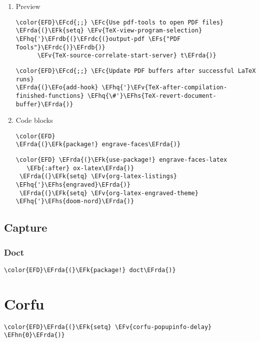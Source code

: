 \documentclass[12pt]{article}
\theoremstyle{plain}%
\theoremstyle{definition}
\theoremstyle{remark}
\newcommand{\EFc}[1]{\textcolor{EFc}{#1}} %
\newcommand{\EFcd}[1]{\textcolor{EFcd}{#1}} %
\newcommand{\EFs}[1]{\textcolor{EFs}{#1}} %
\newcommand{\EFk}[1]{\textcolor{EFk}{#1}} %
\newcommand{\EFb}[1]{\textcolor{EFb}{#1}} %
\newcommand{\EFv}[1]{\textcolor{EFv}{#1}} %
\newcommand{\EFo}[1]{\textcolor{EFo}{#1}} %
\newcommand{\EFhn}[1]{\textcolor{EFhn}{\textbf{#1}}} %
\newcommand{\EFhq}[1]{\textcolor{EFhq}{#1}} %
\newcommand{\EFhs}[1]{\textcolor{EFhs}{#1}} %
\newcommand{\EFrda}[1]{\textcolor{EFrda}{#1}} %
\newcommand{\EFrdb}[1]{\textcolor{EFrdb}{#1}} %
\newcommand{\EFrdc}[1]{\textcolor{EFrdc}{#1}} %
\begin{document}
\begin{enumerate}
\item Preview
\label{sec:orgb0fd629}
\begin{Code}
\begin{Verbatim}
\color{EFD}\EFcd{;;} \EFc{Use pdf-tools to open PDF files}
\EFrda{(}\EFk{setq} \EFv{TeX-view-program-selection} \EFhq{'}\EFrdb{(}\EFrdc{(}output-pdf \EFs{"PDF Tools"}\EFrdc{)}\EFrdb{)}
      \EFv{TeX-source-correlate-start-server} t\EFrda{)}
\end{Verbatim}
\end{Code}
\begin{Code}
\begin{Verbatim}
\color{EFD}\EFcd{;;} \EFc{Update PDF buffers after successful LaTeX runs}
\EFrda{(}\EFo{add-hook} \EFhq{'}\EFv{TeX-after-compilation-finished-functions} \EFhq{\#'}\EFhs{TeX-revert-document-buffer}\EFrda{)}
\end{Verbatim}
\end{Code}
\item Code blocks
\label{sec:org786ba05}
\begin{Code}
\begin{Verbatim}
\color{EFD}
\EFrda{(}\EFk{package!} engrave-faces\EFrda{)}
\end{Verbatim}
\end{Code}
\begin{Code}
\begin{Verbatim}
\color{EFD} \EFrda{(}\EFk{use-package!} engrave-faces-latex
   \EFb{:after} ox-latex\EFrda{)}
 \EFrda{(}\EFk{setq} \EFv{org-latex-listings} \EFhq{'}\EFhs{engraved}\EFrda{)}
 \EFrda{(}\EFk{setq} \EFv{org-latex-engraved-theme} \EFhq{'}\EFhs{doom-nord}\EFrda{)}
\end{Verbatim}
\end{Code}
\end{enumerate}
\subsection{Capture}
\label{sec:org5c9a076}
\subsubsection{Doct}
\label{sec:org2c1da48}
\begin{Code}
\begin{Verbatim}
\color{EFD}\EFrda{(}\EFk{package!} doct\EFrda{)}
\end{Verbatim}
\end{Code}
\section{Corfu}
\label{sec:org56dcf4a}
\begin{Code}
\begin{Verbatim}
\color{EFD}\EFrda{(}\EFk{setq} \EFv{corfu-popupinfo-delay} \EFhn{0}\EFrda{)}
\end{Verbatim}
\end{Code}
\end{document}
